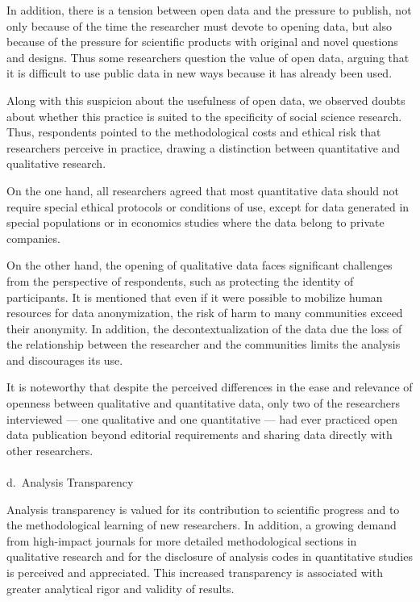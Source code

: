 \documentclass[
  letterpaper,
]{article}
\makeatletter
\let\oldparagraph\paragraph
\renewcommand{\paragraph}{
    \@ifstar
      \xxxParagraphStar
      \xxxParagraphNoStar
  }
\newcommand{\xxxParagraphStar}[1]{\oldparagraph*{#1}\mbox{}}
\newcommand{\xxxParagraphNoStar}[1]{\oldparagraph{#1}\mbox{}}
\makeatother
\begin{document}
In addition, there is a tension between open data and the pressure to
publish, not only because of the time the researcher must devote to
opening data, but also because of the pressure for scientific products
with original and novel questions and designs. Thus some researchers
question the value of open data, arguing that it is difficult to use
public data in new ways because it has already been used.

Along with this suspicion about the usefulness of open data, we observed
doubts about whether this practice is suited to the specificity of
social science research. Thus, respondents pointed to the methodological
costs and ethical risk that researchers perceive in practice, drawing a
distinction between quantitative and qualitative research.

On the one hand, all researchers agreed that most quantitative data
should not require special ethical protocols or conditions of use,
except for data generated in special populations or in economics studies
where the data belong to private companies.

On the other hand, the opening of qualitative data faces significant
challenges from the perspective of respondents, such as protecting the
identity of participants. It is mentioned that even if it were possible
to mobilize human resources for data anonymization, the risk of harm to
many communities exceed their anonymity. In addition, the
decontextualization of the data due the loss of the relationship between
the researcher and the communities limits the analysis and discourages
its use.

It is noteworthy that despite the perceived differences in the ease and
relevance of openness between qualitative and quantitative data, only
two of the researchers interviewed --- one qualitative and one
quantitative --- had ever practiced open data publication beyond
editorial requirements and sharing data directly with other researchers.

\paragraph{d.~Analysis Transparency}\label{d.-analysis-transparency}

Analysis transparency is valued for its contribution to scientific
progress and to the methodological learning of new researchers. In
addition, a growing demand from high-impact journals for more detailed
methodological sections in qualitative research and for the disclosure
of analysis codes in quantitative studies is perceived and appreciated.
This increased transparency is associated with greater analytical rigor
and validity of results.
\end{document}
